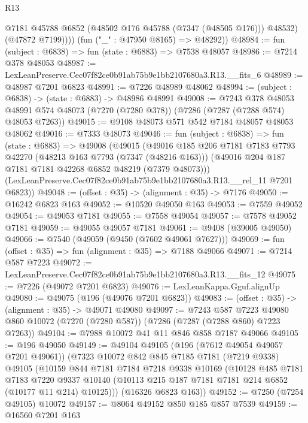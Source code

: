 \begin{lexlean}{R13}
\begin{coremodule}
              @7181
              @45788
              @6852
              (@48502 @176 @45788 (@7347 (@48505 @176)))
              @48532)
            (@47872 @7199))))
      (fun ("_" : @47950 @8165) => @48292))
@48984 := fun (subject : @6838) => fun (state : @6883) => @7538 @48057
@48986 := @7214 @378 @48053
@48987 := LexLeanPreserve.Cec07f82ce0b91ab75b9e1bb2107680a3.R13.__fits_6
@48989 := @48987 @7201 @6823
@48991 := @7226 @48989 @48062
@48994 := (subject : @6838) -> (state : @6883) -> @48986 @48991
@49008 := @7243
    @378
    @48053
    @48991
    @574
    @48073
    (@7270 (@7280 @378))
    (@7286 (@7287 (@7288 @574) @48053 @7263))
@49015 := @9108 @48073 @571 @542 @7184 @48057 @48053 @48062
@49016 := @7333 @48073
@49046 := fun (subject : @6838) =>
  fun (state : @6883) =>
  @49008
    (@49015
      (@49016
        @185
        @206
        @7181
        @7183
        @7793
        @42270
        (@48213 @163 @7793 (@7347 (@48216 @163)))
        (@49016 @204 @187 @7181 @7181 @42268 @6852 @48219 (@7379 @48073)))
      (LexLeanPreserve.Cec07f82ce0b91ab75b9e1bb2107680a3.R13.__rel_11 @7201 @6823))
@49048 := (offset : @35) -> (alignment : @35) -> @7176
@49050 := @16242 @6823 @163
@49052 := @10520 @49050 @163
@49053 := @7559 @49052
@49054 := @49053 @7181
@49055 := @7558 @49054
@49057 := @7578 @49052 @7181
@49059 := @49055 @49057 @7181
@49061 := @9408 (@39005 @49050)
@49066 := @7540 (@49059 (@9450 (@7602 @49061 @7627)))
@49069 := fun (offset : @35) => fun (alignment : @35) => @7188 @49066
@49071 := @7214 @587 @7223
@49072 := LexLeanPreserve.Cec07f82ce0b91ab75b9e1bb2107680a3.R13.__fits_12
@49075 := @7226 (@49072 @7201 @6823)
@49076 := LexLeanKappa.Gguf.alignUp
@49080 := @49075 (@196 (@49076 @7201 @6823))
@49083 := (offset : @35) -> (alignment : @35) -> @49071 @49080
@49097 := @7243
    @587
    @7223
    @49080
    @860
    @10072
    (@7270 (@7280 @587))
    (@7286 (@7287 (@7288 @860) @7223 @7263))
@49104 := @7988 @10072 @41 @11 @846 @858 @7187 @49066
@49105 := @196 @49050
@49149 := @49104
    @49105
    (@196 (@7612 @49054 @49057 @7201 @49061))
    (@7323
      @10072
      @842
      @845
      @7185
      @7181
      (@7219 @9338)
      @49105
      (@10159
        @844
        @7181
        @7184
        @7218
        @9338
        @10169
        (@10128
          @485
          @7181
          @7183
          @7220
          @9337
          @10140
          (@10113 @215 @187 @7181 @7181 @214 @6852 (@10177 @11 @214) @10125)))
      (@16326 @6823 @163))
@49152 := @7250 (@7254 @49105) @10072
@49157 := @8064 @49152 @850 @185 @857 @7539
@49159 := @16560 @7201 @163

\end{coremodule}
\end{lexlean}
